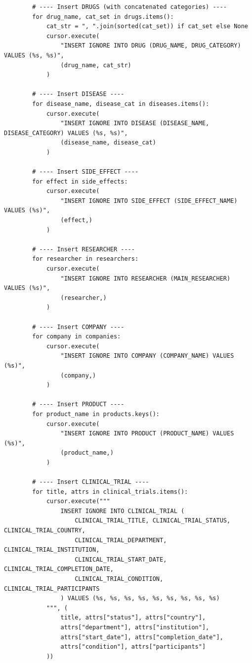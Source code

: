 \documentclass[15pt,a4paper]{article}
\begin{document}
\begin{lstlisting}
        # ---- Insert DRUGS (with concatenated categories) ----
        for drug_name, cat_set in drugs.items():
            cat_str = ", ".join(sorted(cat_set)) if cat_set else None
            cursor.execute(
                "INSERT IGNORE INTO DRUG (DRUG_NAME, DRUG_CATEGORY) VALUES (%s, %s)",
                (drug_name, cat_str)
            )

        # ---- Insert DISEASE ----
        for disease_name, disease_cat in diseases.items():
            cursor.execute(
                "INSERT IGNORE INTO DISEASE (DISEASE_NAME, DISEASE_CATEGORY) VALUES (%s, %s)",
                (disease_name, disease_cat)
            )

        # ---- Insert SIDE_EFFECT ----
        for effect in side_effects:
            cursor.execute(
                "INSERT IGNORE INTO SIDE_EFFECT (SIDE_EFFECT_NAME) VALUES (%s)",
                (effect,)
            )

        # ---- Insert RESEARCHER ----
        for researcher in researchers:
            cursor.execute(
                "INSERT IGNORE INTO RESEARCHER (MAIN_RESEARCHER) VALUES (%s)",
                (researcher,)
            )

        # ---- Insert COMPANY ----
        for company in companies:
            cursor.execute(
                "INSERT IGNORE INTO COMPANY (COMPANY_NAME) VALUES (%s)",
                (company,)
            )

        # ---- Insert PRODUCT ----
        for product_name in products.keys():
            cursor.execute(
                "INSERT IGNORE INTO PRODUCT (PRODUCT_NAME) VALUES (%s)",
                (product_name,)
            )

        # ---- Insert CLINICAL_TRIAL ----
        for title, attrs in clinical_trials.items():
            cursor.execute("""
                INSERT IGNORE INTO CLINICAL_TRIAL (
                    CLINICAL_TRIAL_TITLE, CLINICAL_TRIAL_STATUS, CLINICAL_TRIAL_COUNTRY,
                    CLINICAL_TRIAL_DEPARTMENT, CLINICAL_TRIAL_INSTITUTION,
                    CLINICAL_TRIAL_START_DATE, CLINICAL_TRIAL_COMPLETION_DATE,
                    CLINICAL_TRIAL_CONDITION, CLINICAL_TRIAL_PARTICIPANTS
                ) VALUES (%s, %s, %s, %s, %s, %s, %s, %s, %s)
            """, (
                title, attrs["status"], attrs["country"],
                attrs["department"], attrs["institution"],
                attrs["start_date"], attrs["completion_date"],
                attrs["condition"], attrs["participants"]
            ))


\end{lstlisting}
\end{document}

